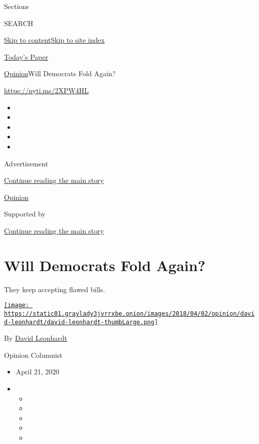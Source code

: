 Sections

SEARCH

\protect\hyperlink{site-content}{Skip to
content}\protect\hyperlink{site-index}{Skip to site index}

\href{https://myaccount.nytimes3xbfgragh.onion/auth/login?response_type=cookie\&client_id=vi}{}

\href{https://www.nytimes3xbfgragh.onion/section/todayspaper}{Today's
Paper}

\href{/section/opinion}{Opinion}\textbar{}Will Democrats Fold Again?

\url{https://nyti.ms/2XPW4HL}

\begin{itemize}
\item
\item
\item
\item
\item
\end{itemize}

Advertisement

\protect\hyperlink{after-top}{Continue reading the main story}

\href{/section/opinion}{Opinion}

Supported by

\protect\hyperlink{after-sponsor}{Continue reading the main story}

\hypertarget{will-democrats-fold-again}{%
\section{Will Democrats Fold Again?}\label{will-democrats-fold-again}}

They keep accepting flawed bills.

\href{https://www.nytimes3xbfgragh.onion/by/david-leonhardt}{\texttt{[image: https://static01.graylady3jvrrxbe.onion/images/2018/04/02/opinion/david-leonhardt/david-leonhardt-thumbLarge.png]}}

By \href{https://www.nytimes3xbfgragh.onion/by/david-leonhardt}{David
Leonhardt}

Opinion Columnist

\begin{itemize}
\item
  April 21, 2020
\item
  \begin{itemize}
  \item
  \item
  \item
  \item
  \item
  \end{itemize}
\end{itemize}

